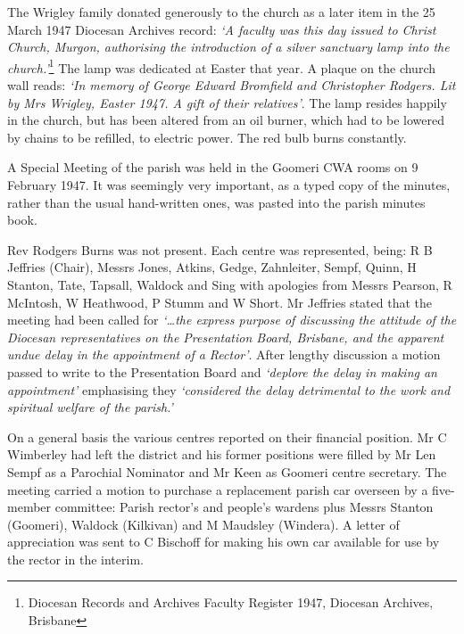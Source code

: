 The Wrigley family donated generously to the church as a later item in the 25 March 1947 Diocesan Archives record: \emph{`A faculty was this day issued to Christ Church, Murgon, authorising the introduction of a silver sanctuary lamp into the church.'}\footnote{Diocesan Records and Archives Faculty Register 1947, Diocesan Archives, Brisbane} The lamp was dedicated at Easter that year. A plaque on the church wall reads: \emph{`In memory of George Edward Bromfield and Christopher Rodgers. Lit by Mrs Wrigley, Easter 1947. A gift of their relatives'}. The lamp resides happily in the church, but has been altered from an oil burner, which had to be lowered by chains to be refilled, to electric power. The red bulb burns constantly.


A Special Meeting of the parish was held in the Goomeri CWA rooms on 9 February 1947. It was seemingly very important, as a typed copy of the minutes, rather than the usual hand-written ones, was pasted into the parish minutes book.



Rev Rodgers Burns was not present. Each centre was represented, being: R B Jeffries (Chair), Messrs Jones, Atkins, Gedge, Zahnleiter, Sempf, Quinn, H Stanton, Tate, Tapsall, Waldock and Sing with apologies from Messrs Pearson, R McIntosh, W Heathwood, P Stumm and W Short. Mr Jeffries stated that the meeting had been called for \emph{`\ldots the express purpose of discussing the attitude of the Diocesan representatives on the Presentation Board, Brisbane, and the apparent undue delay in the appointment of a Rector'}. After lengthy discussion a motion passed to write to the Presentation Board and \emph{`deplore the delay in making an appointment'} emphasising they \emph{`considered the delay detrimental to the work and spiritual welfare of the parish.'}



On a general basis the various centres reported on their financial position. Mr C Wimberley had left the district and his former positions were filled by Mr Len Sempf as a Parochial Nominator and Mr Keen as Goomeri centre secretary. The meeting carried a motion to purchase a replacement parish car overseen by a five-member committee: Parish rector's and people's wardens plus Messrs Stanton (Goomeri), Waldock (Kilkivan) and M Maudsley (Windera). A letter of appreciation was sent to C Bischoff for making his own car available for use by the rector in the interim.



